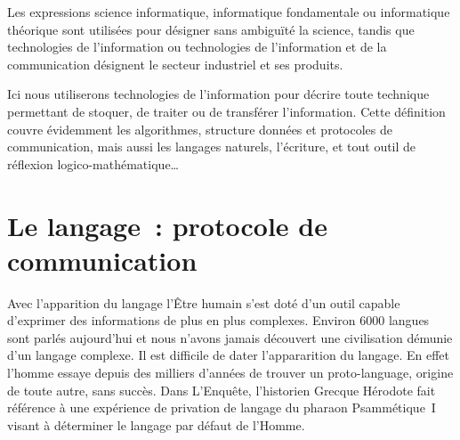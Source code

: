 \begin{coolquote}
Les expressions \og{}science informatique\fg{}, \og{}informatique fondamentale\fg{} ou \og{}informatique théorique\fg{} sont utilisées pour désigner sans ambiguïté la science, tandis que \og{}technologies de l'information\fg{} ou \og{}technologies de l'information et de la communication\fg{} désignent le secteur industriel et ses produits.
\end{coolquote}

Ici nous utiliserons \og{}technologies de l'information\fg{} pour décrire toute technique permettant de stoquer, de traiter ou de transférer l'information. Cette définition couvre évidemment les algorithmes, structure données et protocoles de communication, mais aussi les langages naturels, l'écriture, et tout outil de réflexion logico-mathématique\ldots

\chapter{Le langage~: protocole de communication}
Avec l'apparition du langage l'Être humain s'est doté d'un outil capable d'exprimer des informations de plus en plus complexes. Environ 6000 langues sont parlés aujourd'hui et nous n'avons jamais découvert une civilisation démunie d'un langage complexe\cite{linguistics-pinker}. Il est difficile de dater l'appararition du langage. En effet l'homme essaye depuis des milliers d'années de trouver un \og{}proto-language\fg{}, origine de toute autre, sans succès. Dans \og{}L'Enquête\fg{}, l'historien Grecque Hérodote fait référence à une expérience de \og{}privation de langage\fg{} du pharaon Psammétique~I visant à déterminer le langage \og{}par défaut\fg{} de l'Homme\cite{herodote-privation}. 


